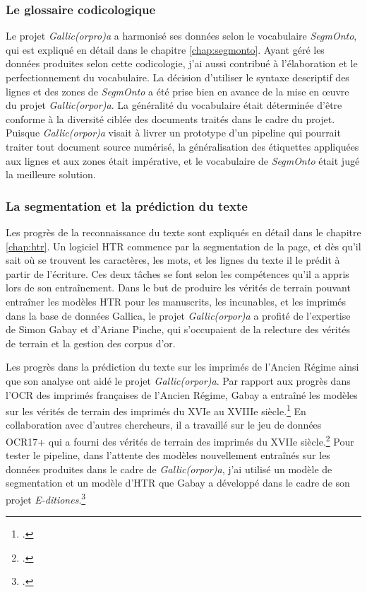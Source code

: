 \documentclass[class=article, crop=false]{standalone}
\begin{document}
\subsubsection{Le glossaire codicologique}
Le projet \textit{Gallic(orpro)a} a harmonisé ses données selon le vocabulaire \textit{SegmOnto}, qui est expliqué en détail dans le chapitre \ref{chap:segmonto}. Ayant géré les données produites selon cette codicologie, j'ai aussi contribué à l'élaboration et le perfectionnement du vocabulaire. La décision d'utiliser le syntaxe descriptif des lignes et des zones de \textit{SegmOnto} a été prise bien en avance de la mise en œuvre du projet \textit{Gallic(orpor)a}. La généralité du vocabulaire était déterminée d'être conforme à la diversité ciblée des documents traités dans le cadre du projet. Puisque \textit{Gallic(orpor)a} visait à livrer un prototype d'un pipeline qui pourrait traiter tout document source numérisé, la généralisation des étiquettes appliquées aux lignes et aux zones était impérative, et le vocabulaire de \textit{SegmOnto} était jugé la meilleure solution.

\subsubsection{La segmentation et la prédiction du texte}
Les progrès de la reconnaissance du texte sont expliqués en détail dans le chapitre \ref{chap:htr}. Un logiciel \acrshort{HTR} commence par la segmentation de la page, et dès qu'il sait où se trouvent les caractères, les mots, et les lignes du texte il le prédit à partir de l'écriture. Ces deux tâches se font selon les compétences qu'il a appris lors de son entraînement. Dans le but de produire les vérités de terrain pouvant entraîner les modèles \acrshort{HTR} pour les manuscrits, les incunables, et les imprimés dans la base de données Gallica, le projet \textit{Gallic(orpor)a} a profité de l'expertise de Simon Gabay et d'Ariane Pinche, qui s'occupaient de la relecture des vérités de terrain et la gestion des corpus d'or.

 Les progrès dans la prédiction du texte sur les imprimés de l'Ancien Régime ainsi que son analyse ont aidé le projet \textit{Gallic(orpor)a}. Par rapport aux progrès dans l'\acrshort{OCR} des imprimés françaises de l'Ancien Régime, Gabay a entraîné les modèles sur les vérités de terrain des imprimés du XVIe au XVIIIe siècle.\footcite{gabayStandardizingLinguisticData2020} En collaboration avec d'autres chercheurs, il a travaillé sur le jeu de données OCR17+ qui a fourni des vérités de terrain des imprimés du XVIIe siècle.\footcite{gabayOCR17GroundTruth2020} Pour tester le pipeline, dans l'attente des modèles nouvellement entraînés sur les données produites dans le cadre de \textit{Gallic(orpor)a}, j'ai utilisé un modèle de segmentation et un modèle d'\acrshort{HTR} que Gabay a développé dans le cadre de son projet \textit{E-ditiones}.\footcite{gabayEditiones17thFrench2018}
\end{document}
